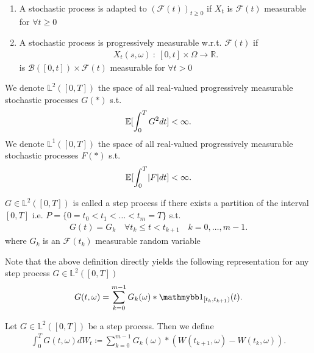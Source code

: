 \begin{definition}
  \hspace{0mm}\\
  \begin{enumerate}
    \item A stochastic process is adapted to $(\mathcal{F}(t))_{t\ge 0}$  if $X_t$ is $\mathcal{F}(t)$ measurable for $\forall  t \ge 0$
    \item A stochastic process is progressively measurable w.r.t. $\mathcal{F}(t)$ if
      \begin{align*}
        X_t(s,\omega ) \ : \ [0,t] \times  \Omega  \to  \mathbb{R}
      .\end{align*}
      is $\mathcal{B}([0,t]) \times  \mathcal{F}(t)$ measurable for $\forall  t > 0$
  \end{enumerate}
\end{definition}
\begin{definition}
  We denote $\mathbb{L}^2([0,T])$  the space of all real-valued progressively measurable stochastic processes $G(*)$ s.t.
  \begin{align*}
    \mathbb{E}[\int_0^{T} G^2 dt ] < \infty
  .\end{align*}
  We denote $\mathbb{L}^{1}([0,T]) $ the space of all real-valued progressively measurable stochastic processes $F(*)$ s.t.
  \begin{align*}
    \mathbb{E}[\int_0^{T} \lvert F\rvert dt ] < \infty
  .\end{align*}
\end{definition}
\begin{definition}
  $G \in  \mathbb{L}^2([0,T])$  is called a step process if there exists a partition of the interval $[0,T]$ i.e.
  $P = \{0 = t_{0} < t_{1} < \ldots <t_m =T\}$ s.t. 
  \begin{align*}
    G(t) = G_k \quad \forall  t_k \le t < t_{k+1} \quad k=0,\ldots ,m-1
  .\end{align*}
  where $G_k$ is an $\mathcal{F}(t_k)$ measurable random variable
\end{definition}
\begin{remark}
Note that the above definition directly yields the following representation for any step process $G \in  \mathbb{L}^2([0,T])$ 
\begin{align*}
  G(t,\omega ) = \sum_{k=0}^{m-1} G_k(\omega )*\cha_{[t_k,t_{k+1})}(t)
.\end{align*}
\end{remark}
\begin{definition}
  Let $G \in  \mathbb{L}^2([0,T])$  be a step process. Then we define 
  \begin{align*}
    \int_0^{T} G(t,\omega ) dW_t \coloneqq \sum_{k=0}^{m-1} G_k(\omega )*(W(t_{k+1},\omega )-W(t_k,\omega ))
  .\end{align*}
\end{definition}
